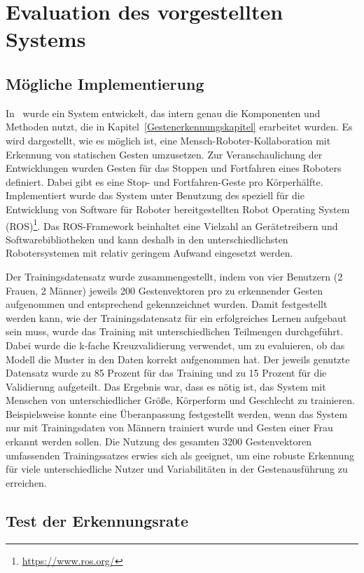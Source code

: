 \chapter{Evaluation des vorgestellten Systems}

\section{Mögliche Implementierung}
In~\cite{flexibleSystem} wurde ein System entwickelt, das intern genau die Komponenten und Methoden nutzt, die in Kapitel~\ref{Gestenerkennungskapitel} erarbeitet wurden. Es wird dargestellt, wie es möglich ist, eine Mensch-Roboter-Kollaboration mit Erkennung von statischen Gesten umzusetzen. Zur Veranschaulichung der Entwicklungen wurden Gesten für das Stoppen und Fortfahren eines Roboters definiert. Dabei gibt es eine Stop- und Fortfahren-Geste pro Körperhälfte. Implementiert wurde das System unter Benutzung des speziell für die Entwicklung von Software für Roboter bereitgestellten Robot Operating System (ROS)\footnote{\url{https://www.ros.org/}}. Das ROS-Framework beinhaltet eine Vielzahl an Gerätetreibern und Softwarebibliotheken und kann deshalb in den unterschiedlichsten Robotersystemen mit relativ geringem Aufwand eingesetzt werden. 

Der Trainingsdatensatz wurde zusammengestellt, indem von vier Benutzern (2 Frauen, 2 Männer) jeweils 200 Gestenvektoren pro zu erkennender Gesten aufgenommen und entsprechend gekennzeichnet wurden. Damit festgestellt werden kann, wie der Trainingsdatensatz für ein erfolgreiches Lernen aufgebaut sein muss, wurde das Training mit unterschiedlichen Teilmengen durchgeführt. Dabei wurde die k-fache Kreuzvalidierung verwendet, um zu evaluieren, ob das Modell die Muster in den Daten korrekt aufgenommen hat. Der jeweils genutzte Datensatz wurde zu 85 Prozent für das Training und zu 15 Prozent für die Validierung aufgeteilt. Das Ergebnis war, dass es nötig ist, das System mit Menschen von unterschiedlicher Größe, Körperform und Geschlecht zu trainieren. Beispielsweise konnte eine Überanpassung festgestellt werden, wenn das System nur mit Trainingsdaten von Männern trainiert wurde und Gesten einer Frau erkannt werden sollen. Die Nutzung des gesamten 3200 Gestenvektoren umfassenden Trainingssatzes erwies sich als geeignet, um eine robuste Erkennung für viele unterschiedliche Nutzer und Variabilitäten in der Gestenausführung zu erreichen.~\cite{flexibleSystem}

\section{Test der Erkennungsrate}

